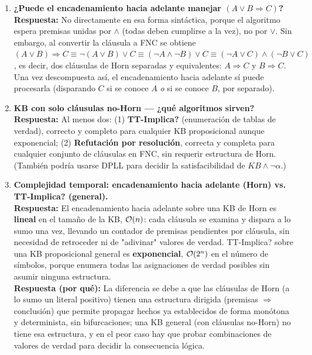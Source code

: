 \begin{enumerate}
    \item \textbf{¿Puede el encadenamiento hacia adelante manejar $(A\lor B \Rightarrow C)$?}\\
    \textbf{Respuesta:} No directamente en esa forma sintáctica, porque el algoritmo espera premisas
    unidas por $\land$ (todas deben cumplirse a la vez), no por $\lor$. Sin embargo, al convertir la
    cláusula a FNC se obtiene $(A\lor B)\Rightarrow C \equiv \neg(A\lor B)\lor C \equiv (\neg A\land
    \neg B)\lor C \equiv (\neg A\lor C)\land(\neg B\lor C)$, es decir, dos cláusulas de Horn
    separadas y equivalentes: $A\Rightarrow C$ y $B\Rightarrow C$. Una vez descompuesta así, el
    encadenamiento hacia adelante sí puede procesarla (disparando $C$ si se conoce $A$ \emph{o} si se
    conoce $B$, por separado).

    \item \textbf{KB con solo cláusulas no-Horn — ¿qué algoritmos sirven?}\\
    \textbf{Respuesta:} Al menos dos: (1) \textbf{TT-Implica?} (enumeración de tablas de verdad),
    correcto y completo para cualquier KB proposicional aunque exponencial; (2) \textbf{Refutación por
    resolución}, correcta y completa para cualquier conjunto de cláusulas en FNC, sin requerir
    estructura de Horn. (También podría usarse DPLL para decidir la satisfacibilidad de $KB\land\neg
    \alpha$.)

    \item \textbf{Complejidad temporal: encadenamiento hacia adelante (Horn) vs. TT-Implica?
    (general).}\\
    \textbf{Respuesta:} El encadenamiento hacia adelante sobre una KB de Horn es \textbf{lineal} en
    el tamaño de la KB, $\mathcal{O}(n)$: cada cláusula se examina y dispara a lo sumo una vez, llevando un
    contador de premisas pendientes por cláusula, sin necesidad de retroceder ni de "adivinar"
    valores de verdad. TT-Implica? sobre una KB proposicional general es \textbf{exponencial},
    $\mathcal{O}(2^n)$ en el número de símbolos, porque enumera todas las asignaciones de verdad posibles
    sin asumir ninguna estructura.\\
    \textbf{Respuesta (por qué):} La diferencia se debe a que las cláusulas de Horn (a lo sumo un
    literal positivo) tienen una estructura dirigida (premisas $\Rightarrow$ conclusión) que permite
    propagar hechos ya establecidos de forma monótona y determinista, sin bifurcaciones; una KB
    general (con cláusulas no-Horn) no tiene esa estructura, y en el peor caso hay que probar
    combinaciones de valores de verdad para decidir la consecuencia lógica.
\end{enumerate}
